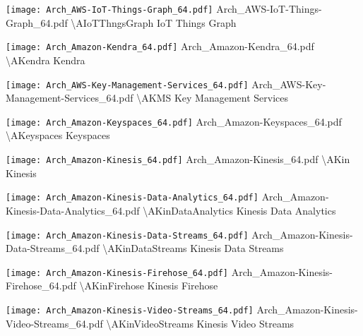  {\texttt{[image: Arch\_AWS-IoT-Things-Graph\_64.pdf]}} {Arch\_AWS-IoT-Things-Graph\_64.pdf} {{\textbackslash}AIoTThngsGraph} {IoT Things Graph}

 {\texttt{[image: Arch\_Amazon-Kendra\_64.pdf]}} {Arch\_Amazon-Kendra\_64.pdf} {{\textbackslash}AKendra} {Kendra}

 {\texttt{[image: Arch\_AWS-Key-Management-Services\_64.pdf]}} {Arch\_AWS-Key-Management-Services\_64.pdf} {{\textbackslash}AKMS} {Key Management Services}

 {\texttt{[image: Arch\_Amazon-Keyspaces\_64.pdf]}} {Arch\_Amazon-Keyspaces\_64.pdf} {{\textbackslash}AKeyspaces} {Keyspaces}

 {\texttt{[image: Arch\_Amazon-Kinesis\_64.pdf]}} {Arch\_Amazon-Kinesis\_64.pdf} {{\textbackslash}AKin} {Kinesis}

 {\texttt{[image: Arch\_Amazon-Kinesis-Data-Analytics\_64.pdf]}} {Arch\_Amazon-Kinesis-Data-Analytics\_64.pdf} {{\textbackslash}AKinDataAnalytics} {Kinesis Data Analytics}

 {\texttt{[image: Arch\_Amazon-Kinesis-Data-Streams\_64.pdf]}} {Arch\_Amazon-Kinesis-Data-Streams\_64.pdf} {{\textbackslash}AKinDataStreams} {Kinesis Data Streams}

 {\texttt{[image: Arch\_Amazon-Kinesis-Firehose\_64.pdf]}} {Arch\_Amazon-Kinesis-Firehose\_64.pdf} {{\textbackslash}AKinFirehose} {Kinesis Firehose}

 {\texttt{[image: Arch\_Amazon-Kinesis-Video-Streams\_64.pdf]}} {Arch\_Amazon-Kinesis-Video-Streams\_64.pdf} {{\textbackslash}AKinVideoStreams} {Kinesis Video Streams}

